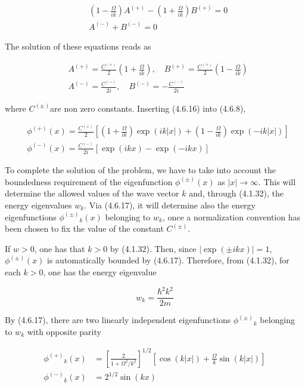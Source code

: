 \documentclass{article}
\begin{document}
\begin{align*}
& \left(1-\frac{\Omega}{i k}\right) A^{(+)}-\left(1+\frac{\Omega}{i k}\right) B^{(+)}=0  \tag{4.6.15a}\\
& A^{(-)}+B^{(-)}=0 \tag{4.6.15b}
\end{align*}
 

The solution of these equations reads as
 
\begin{align*}
& A^{(+)}=\frac{C^{(+)}}{2}\left(1+\frac{\Omega}{i k}\right), \quad B^{(+)}=\frac{C^{(+)}}{2}\left(1-\frac{\Omega}{i k}\right)  \tag{4.6.16a}\\
& A^{(-)}=\frac{C^{(-)}}{2 i}, \quad B^{(-)}=-\frac{C^{(-)}}{2 i} \tag{4.6.16b}
\end{align*}
 
where $C^{( \pm)}$are non zero constants. Inserting (4.6.16) into (4.6.8),
 
\begin{align*}
& \phi^{(+)}(x)=\frac{C^{(+)}}{2}\left[\left(1+\frac{\Omega}{i k}\right) \exp (i k|x|)+\left(1-\frac{\Omega}{i k}\right) \exp (-i k|x|)\right]  \tag{4.6.17a}\\
& \phi^{(-)}(x)=\frac{C^{(-)}}{2 i}[\exp (i k x)-\exp (-i k x)] \tag{4.6.17b}
\end{align*}
 

To complete the solution of the problem, we have to take into account the boundedness requirement of the eigenfunction $\phi^{( \pm)}(x)$ as $|x| \rightarrow \infty$. This will determine the allowed values of the wave vector $k$ and, through (4.1.32), the energy eigenvalues $w_{k}$. Via (4.6.17), it will determine also the energy eigenfunctions $\phi^{( \pm)}{ }_{k}(x)$ belonging to $w_{k}$, once a normalization convention has been chosen to fix the value of the constant $C^{( \pm)}$.

If $w>0$, one has that $k>0$ by (4.1.32). Then, since $|\exp ( \pm i k x)|=1$, $\phi^{( \pm)}(x)$ is automatically bounded by (4.6.17). Therefore, from (4.1.32), for each $k>0$, one has the energy eigenvalue
 
\begin{equation*}
w_{k}=\frac{\hbar^{2} k^{2}}{2 m} \tag{4.6.18}
\end{equation*}
 

By (4.6.17), there are two linearly independent eigenfunctions $\phi^{( \pm)}{ }_{k}$ belonging to $w_{k}$ with opposite parity
 
\begin{align*}
\phi^{(+)}{ }_{k}(x) & =\left[\frac{2}{1+\Omega^{2} / k^{2}}\right]^{1 / 2}\left[\cos (k|x|)+\frac{\Omega}{k} \sin (k|x|)\right]  \tag{4.6.19a}\\
\phi^{(-)}{ }_{k}(x) & =2^{1 / 2} \sin (k x) \tag{4.6.19b}
\end{align*}
 
\end{document}

